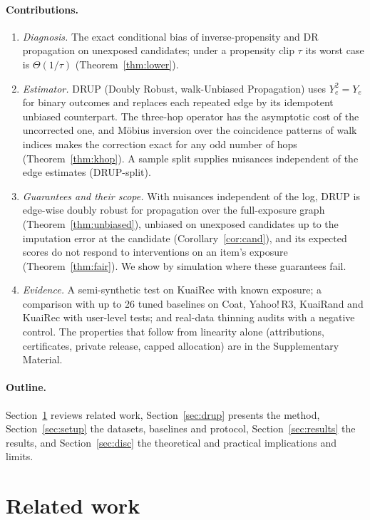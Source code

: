 \paragraph{Contributions.}
\begin{enumerate}
\item \emph{Diagnosis.} The exact conditional bias of inverse-propensity and DR
propagation on unexposed candidates; under a propensity clip $\tau$ its worst
case is $\Theta(1/\tau)$ (Theorem~\ref{thm:lower}).
\item \emph{Estimator.} DRUP (Doubly Robust, walk-Unbiased Propagation) uses
$Y_e^2=Y_e$ for binary outcomes and replaces each repeated edge by its
idempotent unbiased counterpart. The three-hop operator has the asymptotic cost
of the uncorrected one, and Möbius inversion over the coincidence patterns of
walk indices makes the correction exact for any odd number of hops
(Theorem~\ref{thm:khop}). A sample split supplies nuisances independent of the
edge estimates (DRUP-split).
\item \emph{Guarantees and their scope.} With nuisances independent of the log,
DRUP is edge-wise doubly robust for propagation over the full-exposure graph
(Theorem~\ref{thm:unbiased}), unbiased on unexposed candidates up to the
imputation error at the candidate (Corollary~\ref{cor:cand}), and its expected
scores do not respond to interventions on an item's exposure
(Theorem~\ref{thm:fair}). We show by simulation where these guarantees fail.
\item \emph{Evidence.} A semi-synthetic test on KuaiRec with known exposure;
a comparison with up to 26 tuned baselines on Coat, Yahoo!\,R3, KuaiRand and
KuaiRec with user-level tests; and real-data thinning audits with a negative
control. The properties that follow from linearity alone (attributions,
certificates, private release, capped allocation) are in the Supplementary
Material.
\end{enumerate}

\paragraph{Outline.} Section~\ref{sec:related} reviews related work,
Section~\ref{sec:drup} presents the method, Section~\ref{sec:setup} the datasets,
baselines and protocol, Section~\ref{sec:results} the results, and
Section~\ref{sec:disc} the theoretical and practical implications and limits.

\section{Related work}\label{sec:related}

